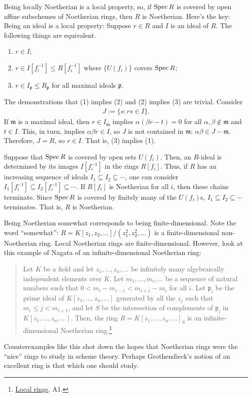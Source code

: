 \documentclass [11 pt, oneside] {article}
\begin{document}
\begin{remark}
	Being locally Noetherian is a local property, so, if $\operatorname{Spec} R$ is covered by open affine subschemes of Noetherian rings, then $R$ is Noetherian. Here's the key: Being an ideal is a local property: Suppose $r\in R$ and $I$ is an ideal of $R$. The following things are equivalent.
	\begin{enumerate}
		\item $r\in I$;
		\item $r\in I[f_i^{-1}]\le R[f_i^{-1}]$ where $\{U({f_i})\}$ covers $\operatorname{Spec} R$;
		\item $r\in I_{\mathfrak{p}}\le R_{\mathfrak{p}}$ for all maximal ideals $\mathfrak{p}$.
	\end{enumerate}
	The demonstrations that (1) implies (2) and (2) implies (3) are trivial. Consider
	\begin{align*}
		J := \{ s : rs \in I\}.
	\end{align*}
	If $\mathfrak{m}$ is a maximal ideal, then $r\in I_{\mathfrak{m}}$ implies $\alpha(\beta r - t) =0$ for all $\alpha,\beta\notin \mathfrak{m}$ and $t\in I$. This, in turn, implies $\alpha\beta r\in I$, so $J$ is not contained in $\mathfrak{m}$: $\alpha\beta\in J-\mathfrak{m}$. Therefore, $J=R$, so $r\in I$. That is, (3) implies (1).

Suppose that $\operatorname{Spec} R$ is covered by open sets $U({f_i})$. Then, an $R$-ideal is determined by its images $I[f_i^{-1}]$ in the rings $R[f_i]$. Thus, if $R$ has an increasing sequence of ideals $I_1\subseteq I_2\subseteq \cdots$, one can consider $I_1[f_i^{-1}]\subseteq I_2[f_i^{-1}]\subseteq\cdots$. If $R[f_i]$ is Noetherian for all $i$, then these chains terminate. Since $\operatorname{Spec} R$ is covered by finitely many of the $U({f_i})$s, $I_1\subseteq I_2\subseteq \cdots$ terminates. That is, $R$ is Noetherian.  
\end{remark}

\begin{remark}
	Being Noetherian somewhat corresponds to being finite-dimensional. Note the word ``somewhat'': $R = K[z_1,z_2,\hdots]/(z_1^2,z_2^2,\hdots)$ is a finite-dimensional non-Noetherian ring. Local Noetherian rings are finite-dimensional. However, look at this example of Nagata of an infinite-dimensional Noetherian ring:
\begin{quote}
\small
Let $K$ be a field and let $z_1,\hdots, z_n,\hdots$ be infinitely many algebraically independent elements over $K$. Let $m_1,\hdots, m_i,\hdots$ be a sequence of natural numbers such that $0<m_i-m_{i-1} < m_{i+1}-m_i$ for all $i$. Let $\mathfrak{p}_i$ be the prime ideal of $K[z_1,\hdots, z_n,\hdots]$ generated by all the $z_j$ such that $m_i\le j<m_{i+1}$, and let $S$ be the intersection of complements of $\mathfrak{p}_i$ in $K[z_1,\hdots, z_n,\hdots]$. Then, the ring $R = K[z_1,\hdots, z_n,\hdots]_S$ is an infinite-dimensional Noetherian ring.\footnote{\ul{Local rings}, A1.}
\end{quote}

	Counterexamples like this shot down the hopes that Noetherian rings were the ``nice'' rings to study in scheme theory. Perhaps Grothendieck's notion of an excellent ring is that which one should study.
\end{remark}
\end{document}
